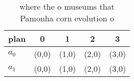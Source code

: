 \documentclass[a4paper]{article}
\begin{document}
\begin{table}
\begin{adjustbox}{width=0.8\columnwidth}
\begin{tabular}{|l|l|l|l|l|}
\hline
\textbf{plan} & \multicolumn{1}{c|}{\textbf{0}} & \multicolumn{1}{c|}{\textbf{1}} & \multicolumn{1}{c|}{\textbf{2}} & \multicolumn{1}{c|}{\textbf{3}} \\ \hline
\textbf{$a_0$}  & (0,0) & (1,0) & (2,0) & (3,0) \\ \hline
\textbf{$a_1$}  & (0,0) & (1,0) & (2,0) & (3,0) \\ \hline
\end{tabular}
\end{adjustbox}
\caption{where the o museums that Pamonha corn evolution o
}
\end{table}
\end{document}
